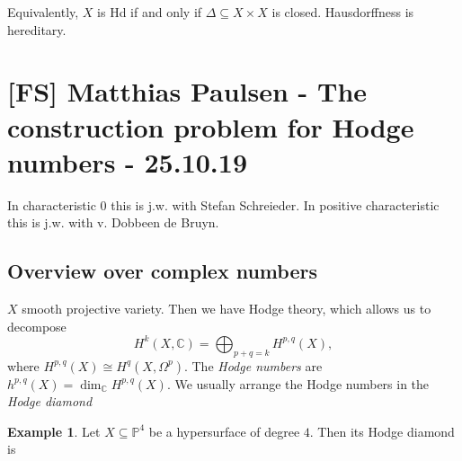 \documentclass[11pt,A4]{article}
\theoremstyle{plain}
\theoremstyle{definition}
\newtheorem{exa}[thm]{Example}
\theoremstyle{remark}
\newcommand{\1}{\mathbbm{1}}
\newcommand{\C}{\mathbb{C}}
\renewcommand{\P}{\mathbb{P}}
\begin{document}
Equivalently, $X$ is Hd if and only if $\Delta\subseteq X\times X$ is closed.
Hausdorffness is hereditary.

\section{[FS] Matthias Paulsen - The construction problem for Hodge numbers - 25.10.19}

In characteristic $0$ this is j.w. with Stefan Schreieder.
In positive characteristic this is j.w. with v. Dobbeen de Bruyn.

\subsection{Overview over complex numbers}

$X$ smooth projective variety.
Then we have Hodge theory, which allows us to decompose
\[ H^{k}(X,\C)=\bigoplus_{p+q=k}H^{p,q}(X), \]
where $H^{p,q}(X)\cong H^{q}(X,\Omega^{p})$.
The \textit{Hodge numbers} are $h^{p,q}(X)=\dim_{\C}H^{p,q}(X)$.
We usually arrange the Hodge numbers in the \textit{Hodge diamond}
\begin{center}
\end{center}

\begin{exa}
    Let $X\subseteq \P^{4}$ be a hypersurface of degree $4$.
    Then its Hodge diamond is
    \begin{center}
    \end{center}
\end{exa}
\end{document}
